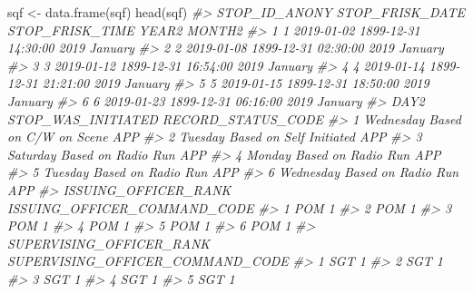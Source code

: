 \documentclass[
]{krantz}
\makeatletter
\newenvironment{Shaded}{\begin{snugshade}}{\end{snugshade}}
\newcommand{\CommentTok}[1]{\textcolor[rgb]{0.37,0.37,0.37}{\textit{#1}}}
\newcommand{\FunctionTok}[1]{\textcolor[rgb]{0,0,0}{#1}}
\newcommand{\NormalTok}[1]{#1}
\newcommand{\OtherTok}[1]{\textcolor[rgb]{0.37,0.37,0.37}{#1}}
\newenvironment{kframe}{%
\medskip{}
\setlength{\fboxsep}{.8em}
 \def\at@end@of@kframe{}%
 \ifinner\ifhmode%
  \def\at@end@of@kframe{\end{minipage}}%
  \begin{minipage}{\columnwidth}%
 \fi\fi%
 \def\FrameCommand##1{\hskip\@totalleftmargin \hskip-\fboxsep
 \colorbox{shadecolor}{##1}\hskip-\fboxsep
     \hskip-\linewidth \hskip-\@totalleftmargin \hskip\columnwidth}%
 \MakeFramed {\advance\hsize-\width
   \@totalleftmargin\z@ \linewidth\hsize
   \@setminipage}}%
 {\par\unskip\endMakeFramed%
 \at@end@of@kframe}
\renewenvironment{Shaded}{\begin{kframe}}{\end{kframe}}
\makeatother
\begin{document}
\begin{Shaded}
\begin{Highlighting}[]
\NormalTok{sqf }\OtherTok{\textless{}{-}} \FunctionTok{data.frame}\NormalTok{(sqf)}
\FunctionTok{head}\NormalTok{(sqf)}
\CommentTok{\#\textgreater{}   STOP\_ID\_ANONY STOP\_FRISK\_DATE     STOP\_FRISK\_TIME YEAR2  MONTH2}
\CommentTok{\#\textgreater{} 1             1      2019{-}01{-}02 1899{-}12{-}31 14:30:00  2019 January}
\CommentTok{\#\textgreater{} 2             2      2019{-}01{-}08 1899{-}12{-}31 02:30:00  2019 January}
\CommentTok{\#\textgreater{} 3             3      2019{-}01{-}12 1899{-}12{-}31 16:54:00  2019 January}
\CommentTok{\#\textgreater{} 4             4      2019{-}01{-}14 1899{-}12{-}31 21:21:00  2019 January}
\CommentTok{\#\textgreater{} 5             5      2019{-}01{-}15 1899{-}12{-}31 18:50:00  2019 January}
\CommentTok{\#\textgreater{} 6             6      2019{-}01{-}23 1899{-}12{-}31 06:16:00  2019 January}
\CommentTok{\#\textgreater{}        DAY2      STOP\_WAS\_INITIATED RECORD\_STATUS\_CODE}
\CommentTok{\#\textgreater{} 1 Wednesday   Based on C/W on Scene                APP}
\CommentTok{\#\textgreater{} 2   Tuesday Based on Self Initiated                APP}
\CommentTok{\#\textgreater{} 3  Saturday      Based on Radio Run                APP}
\CommentTok{\#\textgreater{} 4    Monday      Based on Radio Run                APP}
\CommentTok{\#\textgreater{} 5   Tuesday      Based on Radio Run                APP}
\CommentTok{\#\textgreater{} 6 Wednesday      Based on Radio Run                APP}
\CommentTok{\#\textgreater{}   ISSUING\_OFFICER\_RANK ISSUING\_OFFICER\_COMMAND\_CODE}
\CommentTok{\#\textgreater{} 1                  POM                            1}
\CommentTok{\#\textgreater{} 2                  POM                            1}
\CommentTok{\#\textgreater{} 3                  POM                            1}
\CommentTok{\#\textgreater{} 4                  POM                            1}
\CommentTok{\#\textgreater{} 5                  POM                            1}
\CommentTok{\#\textgreater{} 6                  POM                            1}
\CommentTok{\#\textgreater{}   SUPERVISING\_OFFICER\_RANK SUPERVISING\_OFFICER\_COMMAND\_CODE}
\CommentTok{\#\textgreater{} 1                      SGT                                1}
\CommentTok{\#\textgreater{} 2                      SGT                                1}
\CommentTok{\#\textgreater{} 3                      SGT                                1}
\CommentTok{\#\textgreater{} 4                      SGT                                1}
\CommentTok{\#\textgreater{} 5                      SGT                                1}

\end{Highlighting}
\end{Shaded}
\end{document}
